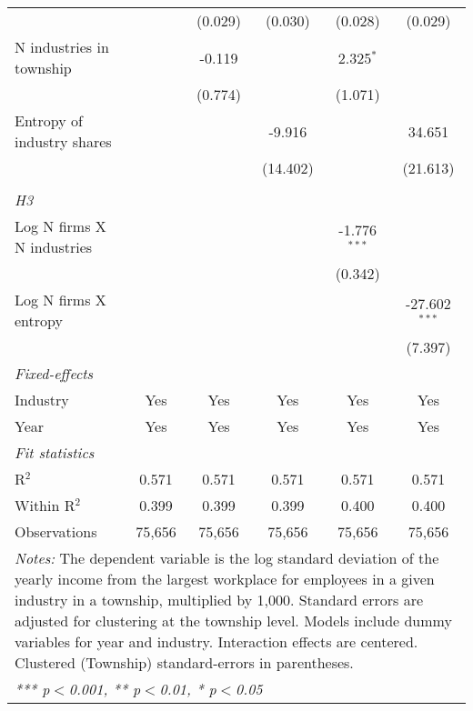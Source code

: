 \begin{tabular}{lccccc}
                                        &                  & (0.029)          & (0.030)          & (0.028)          & (0.029)\\   
   N industries in township             &                  & -0.119           &                  & 2.325$^{*}$      &   \\   
                                        &                  & (0.774)          &                  & (1.071)          &   \\   
   Entropy of industry shares           &                  &                  & -9.916           &                  & 34.651\\   
                                        &                  &                  & (14.402)         &                  & (21.613)\\   
\hdashline %
\\[0.1ex] %
\emph{H3} \\ 
   Log N firms X N industries           &                  &                  &                  & -1.776$^{***}$   &   \\   
                                        &                  &                  &                  & (0.342)          &   \\   
   Log N firms X entropy                &                  &                  &                  &                  & -27.602$^{***}$\\   
                                        &                  &                  &                  &                  & (7.397)\\   
   \midrule
   \emph{Fixed-effects}\\
   Industry                             & Yes              & Yes              & Yes              & Yes              & Yes\\  
   Year                                 & Yes              & Yes              & Yes              & Yes              & Yes\\  
   \midrule
   \emph{Fit statistics}\\
   R$^2$                                & 0.571            & 0.571            & 0.571            & 0.571            & 0.571\\  
   Within R$^2$                         & 0.399            & 0.399            & 0.399            & 0.400            & 0.400\\  
   Observations                         & 75,656           & 75,656           & 75,656           & 75,656           & 75,656\\  
   \midrule \midrule
\multicolumn{6}{p{16cm}}{\emph{Notes:} The dependent variable is the log 
    standard deviation of the yearly income from the largest workplace for 
    employees in a given industry in a township, multiplied by 1,000. Standard 
    errors are adjusted for clustering at the township level. Models include 
    dummy variables for year and industry. Interaction effects are centered. 
    Clustered (Township) standard-errors in parentheses.}\\
\multicolumn{6}{l}{\emph{*** p$<$0.001, ** p$<$0.01, * p$<$0.05}} \\ 
\end{tabular}
\par\endgroup
